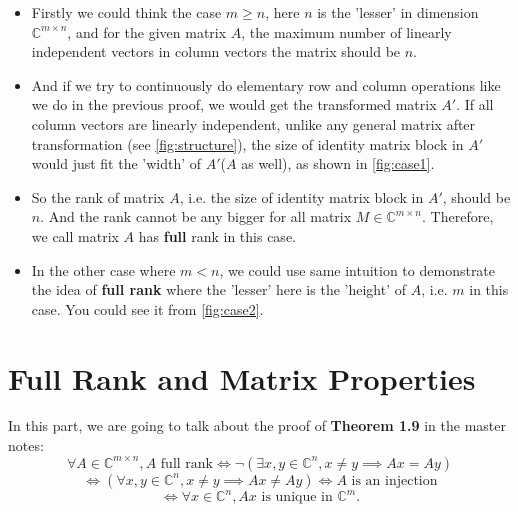 \begin{itemize}
  \item Firstly we could think the case $m \ge n$, here $n$ is the 'lesser' in dimension $\mathbb{C}^{m \times n}$, and for the given matrix $A$, the maximum number of linearly independent vectors in column vectors the matrix should be $n$. 
  \item And if we try to continuously do elementary row and column operations like we do in the previous proof, we would get the transformed matrix $A'$. If all column vectors are linearly independent, unlike any general matrix after transformation (see \autoref{fig:structure}), the size of identity matrix block in $A'$ would just fit the 'width' of $A'$($A$ as well), as shown in \autoref{fig:case1}. 
  \item So the rank of matrix $A$, i.e. the size of identity matrix block in $A'$, should be $n$. And the rank cannot be any bigger for all matrix $M \in \mathbb{C}^{m \times n}$. Therefore, we call matrix $A$ has \textbf{full} rank in this case.
  \item In the other case where $m < n$, we could use same intuition to demonstrate the idea of  \textbf{full rank} where the 'lesser' here is the 'height' of $A$, i.e.  $m$ in this case. You could see it from \autoref{fig:case2}.
\end{itemize}
\section{Full Rank and Matrix Properties}%
In this part, we are going to talk about the proof of  \textbf{Theorem 1.9} in the master notes:
\[
  \forall A \in \mathbb{C}^{m \times n}, A \text{ full rank} \iff \neg (\exists x, y \in \mathbb{C}^{n}, x \neq  y \implies Ax = Ay)
\]
\[
  \iff (\forall x, y \in \mathbb{C}^{n}, x \neq y \implies Ax \neq Ay) \iff A \text{ is an injection}
\]
\[
\iff \forall x \in \mathbb{C}^{n}, Ax \text{ is unique in }\mathbb{C}^{m}
.\] 
